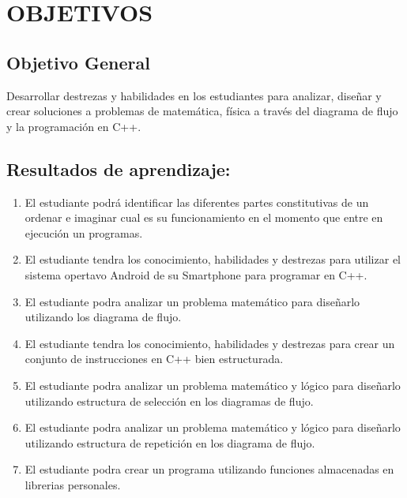 \documentclass[a4pa<per,12pt,spanish]{article}
\newcommand{\ResuApreA}{El estudiante podrá identificar las diferentes partes constitutivas de un ordenar e imaginar cual es su funcionamiento en el momento que entre en ejecución un programas.}
\newcommand{\ResuApreB}{El estudiante tendra los conocimiento, habilidades y destrezas para utilizar el sistema opertavo Android de su Smartphone para programar en C++.}
\newcommand{\ResuApreC}{El estudiante podra analizar un problema matemático para diseñarlo utilizando los diagrama de flujo.}
\newcommand{\ResuApreD}{El estudiante tendra los conocimiento, habilidades y destrezas para crear un conjunto de instrucciones en C++ bien estructurada.}
\newcommand{\ResuApreE}{El estudiante podra analizar un problema matemático y lógico para  diseñarlo utilizando estructura de selección en los diagramas de flujo.}
\newcommand{\ResuApreF}{El estudiante podra analizar un problema matemático y lógico para  diseñarlo utilizando estructura de repetición en los diagrama de flujo.}
\newcommand{\ResuApreG}{El estudiante podra crear un programa utilizando funciones almacenadas en librerias personales.}
\begin{document}
\section{OBJETIVOS}
\subsection{Objetivo General}
Desarrollar destrezas y habilidades en los estudiantes para analizar, diseñar y crear soluciones a problemas de matemática, física a través del diagrama de flujo y la programación  en C++.

\subsection{Resultados de aprendizaje:}

\begin{enumerate}
\item \ResuApreA
\item \ResuApreB
\item \ResuApreC
\item \ResuApreD
\item \ResuApreE
\item \ResuApreF
\item \ResuApreG

\end{enumerate}
\end{document}
